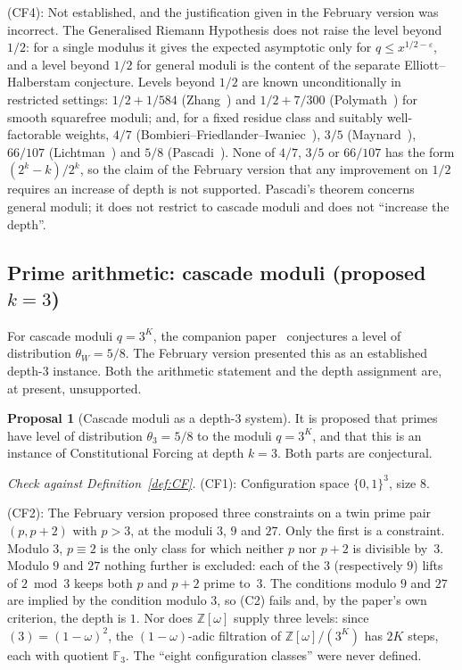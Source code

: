 \documentclass[12pt]{amsart}
\theoremstyle{plain}
\theoremstyle{definition}
\newtheorem{proposal}[theorem]{Proposal}
\theoremstyle{remark}
\newcommand{\Z}{\mathbb{Z}}
\begin{document}
(CF4): Not established, and the justification given in the February version was
incorrect. The Generalised Riemann Hypothesis does not raise the level beyond
$1/2$: for a single modulus it gives the expected asymptotic only for
$q \leq x^{1/2-\varepsilon}$, and a level beyond $1/2$ for general moduli is
the content of the separate Elliott--Halberstam conjecture. Levels beyond $1/2$
are known unconditionally in restricted settings: $1/2 + 1/584$
(Zhang~\cite{Zhang2014}) and $1/2 + 7/300$ (Polymath~\cite{Polymath2014}) for
smooth squarefree moduli; and, for a fixed residue class and suitably
well-factorable weights, $4/7$ (Bombieri--Friedlander--Iwaniec~\cite{BFI1986}),
$3/5$ (Maynard~\cite{Maynard2020}), $66/107$ (Lichtman~\cite{Lichtman2023}) and
$5/8$ (Pascadi~\cite{Pascadi2025}). None of $4/7$, $3/5$ or $66/107$ has the
form $(2^k - k)/2^k$, so the claim of the February version that any
improvement on $1/2$ requires an increase of depth is not supported.
Pascadi's theorem concerns general moduli; it does not restrict to cascade
moduli and does not ``increase the depth''.

\subsection{Prime arithmetic: cascade moduli (proposed $k = 3$)}
\label{sec:cascade}

For cascade moduli $q = 3^K$, the companion paper~\cite{WakilEisenstein}
conjectures a level of distribution $\theta_W = 5/8$. The February version
presented this as an established depth-$3$ instance. Both the arithmetic
statement and the depth assignment are, at present, unsupported.

\begin{proposal}[Cascade moduli as a depth-$3$ system]
\label{prop:cascade}
It is proposed that primes have level of distribution $\theta_3 = 5/8$ to the
moduli $q = 3^K$, and that this is an instance of Constitutional Forcing at
depth $k = 3$. Both parts are conjectural.
\end{proposal}

\noindent\emph{Check against Definition~\ref{def:CF}.}
(CF1): Configuration space $\{0,1\}^3$, size $8$.

(CF2): The February version proposed three constraints on a twin prime pair
$(p, p+2)$ with $p > 3$, at the moduli $3$, $9$ and $27$. Only the first is a
constraint. Modulo $3$, $p \equiv 2$ is the only class for which neither $p$
nor $p + 2$ is divisible by~$3$. Modulo $9$ and $27$ nothing further is
excluded: each of the $3$ (respectively $9$) lifts of $2 \bmod 3$ keeps both $p$
and $p + 2$ prime to~$3$. The conditions modulo $9$ and $27$ are implied by the
condition modulo $3$, so (C2) fails and, by the paper's own criterion, the
depth is $1$. Nor does $\Z[\omega]$ supply three levels: since
$(3) = (1-\omega)^2$, the $(1-\omega)$-adic filtration of $\Z[\omega]/(3^K)$
has $2K$ steps, each with quotient $\mathbb{F}_3$. The ``eight configuration
classes'' were never defined.
\end{document}
